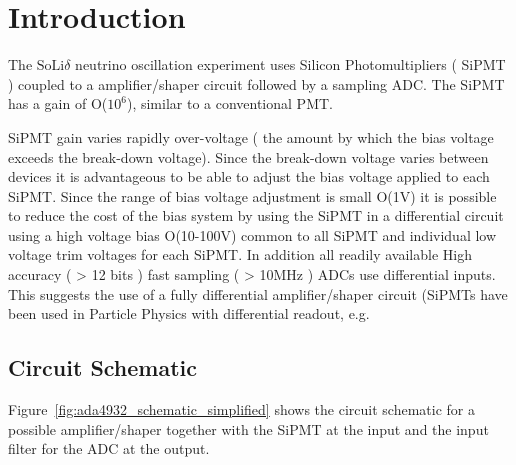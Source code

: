 \documentclass[
12pt, %
a4paper, %
oneside, %
headinclude,footinclude, %
apacite
]{scrartcl}
\begin{document}


{\let\thefootnote\relax{}}

{\let\thefootnote\relax{}}


\newpage %

\section{Introduction}

The $\mathrm{SoLi}\delta$ neutrino oscillation experiment uses Silicon Photomultipliers ( SiPMT ) coupled to a amplifier/shaper circuit followed by a sampling ADC. The SiPMT has a gain of O($10^6$), similar to a conventional PMT.

SiPMT gain varies rapidly over-voltage ( the amount by which the bias voltage exceeds the break-down voltage). Since the break-down voltage varies between devices it is advantageous to be able to adjust the bias voltage applied to each SiPMT. Since the range of bias voltage adjustment is small O(1V) it is possible to reduce the cost of the bias system by using the SiPMT in a differential circuit using a high voltage bias O(10-100V) common to all SiPMT and individual low voltage trim voltages for each SiPMT. In addition all readily available High accuracy ( > 12 bits ) fast sampling ( > 10MHz ) ADCs use differential inputs. This suggests the use of a fully differential amplifier/shaper circuit (SiPMTs have been used in Particle Physics with differential readout, e.g. \cite{5688208}

\subsection{Circuit Schematic}

Figure~\vref{fig:ada4932_schematic_simplified} shows the circuit schematic for a possible amplifier/shaper together with the SiPMT at the input and the input filter for the ADC at the output.
\end{document}
